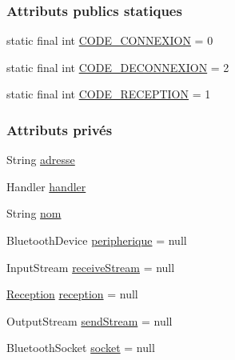 \subsubsection*{Attributs publics statiques}
\begin{DoxyCompactItemize}
\item 
static final int \hyperlink{classcom_1_1example_1_1ekawa_1_1_peripherique_addb8ee767dc82567360551db1004463e}{C\+O\+D\+E\+\_\+\+C\+O\+N\+N\+E\+X\+I\+ON} = 0
\item 
static final int \hyperlink{classcom_1_1example_1_1ekawa_1_1_peripherique_a99f0e30a113d64b30598c6305657dcee}{C\+O\+D\+E\+\_\+\+D\+E\+C\+O\+N\+N\+E\+X\+I\+ON} = 2
\item 
static final int \hyperlink{classcom_1_1example_1_1ekawa_1_1_peripherique_a532f5da1747b68217b8764db9b85e845}{C\+O\+D\+E\+\_\+\+R\+E\+C\+E\+P\+T\+I\+ON} = 1
\end{DoxyCompactItemize}
\subsubsection*{Attributs privés}
\begin{DoxyCompactItemize}
\item 
String \hyperlink{classcom_1_1example_1_1ekawa_1_1_peripherique_a2617309b5112a289fcd9f9570154341c}{adresse}
\item 
Handler \hyperlink{classcom_1_1example_1_1ekawa_1_1_peripherique_ab6a0c0cae2eb087315d0d04d1cf6c3dc}{handler}
\item 
String \hyperlink{classcom_1_1example_1_1ekawa_1_1_peripherique_a0fb529bb80d55dd616821bce74a2af8c}{nom}
\item 
Bluetooth\+Device \hyperlink{classcom_1_1example_1_1ekawa_1_1_peripherique_ab509bd2180c53845197423813a97f025}{peripherique} = null
\item 
Input\+Stream \hyperlink{classcom_1_1example_1_1ekawa_1_1_peripherique_af46a939491178c90c1ecd75dd781f4b6}{receive\+Stream} = null
\item 
\hyperlink{classcom_1_1example_1_1ekawa_1_1_reception}{Reception} \hyperlink{classcom_1_1example_1_1ekawa_1_1_peripherique_a0192ad260e727ed46efa968a79364338}{reception} = null
\item 
Output\+Stream \hyperlink{classcom_1_1example_1_1ekawa_1_1_peripherique_a9bacd88ef2a26eedac31fda999734639}{send\+Stream} = null
\item 
Bluetooth\+Socket \hyperlink{classcom_1_1example_1_1ekawa_1_1_peripherique_a00e15bc5bdafff61d45d4e39d7dd21e0}{socket} = null
\end{DoxyCompactItemize}
